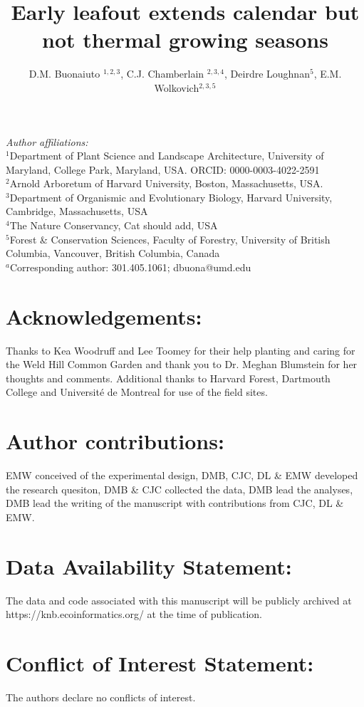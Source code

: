 \documentclass{article}
\title{Early leafout extends calendar but not thermal growing seasons} %
\author{D.M. Buonaiuto $^{1,2,3}$, C.J. Chamberlain $^{2,3,4}$,
Deirdre Loughnan$^{5}$, E.M. Wolkovich$^{2,3,5}$}
\begin{document}



\maketitle

\noindent \emph{Author affiliations:}\\
\noindent $^1$Department of Plant Science and Landscape Architecture, University of Maryland, College Park, Maryland, USA. ORCID: 0000-0003-4022-2591\\
\noindent $^2$Arnold Arboretum of Harvard University, Boston, Massachusetts, USA.\\
$^3$Department of Organismic and Evolutionary Biology, Harvard University, Cambridge, Massachusetts, USA \\
$^4$The Nature Conservancy, Cat should add, USA \\
$^5$Forest \& Conservation Sciences, Faculty of Forestry, University of British Columbia, Vancouver, British Columbia, Canada\\
$^a$Corresponding author: 301.405.1061; dbuona@umd.edu\\

\section*{Acknowledgements:}
Thanks to Kea Woodruff and Lee Toomey for their help planting and caring for the Weld Hill Common Garden and thank you to Dr. Meghan Blumstein for her thoughts and comments. Additional thanks to Harvard Forest, Dartmouth College and Université de Montreal for use of the field sites.
\section*{Author contributions:}
EMW conceived of the experimental design, DMB, CJC, DL \& EMW developed the research quesiton, DMB \& CJC collected the data, DMB lead the analyses, DMB lead the writing of the manuscript with contributions from CJC, DL \& EMW.
\section*{Data Availability Statement:}
The data and code associated with this manuscript will be publicly archived at https://knb.ecoinformatics.org/ at the time of publication.
\section*{Conflict of Interest Statement:}
The authors declare no conflicts of interest.
\end{document}
